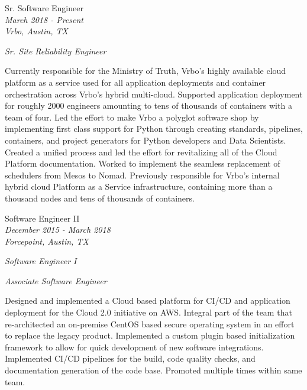 \documentclass[10pt]{article} %
\begin{document}
\begin{minipage}[t]{0.5\textwidth}
{\raggedright\large Sr. Software Engineer\\
\textit{March 2018 - Present}\\
\textit{Vrbo, Austin, TX} \\
\raggedright\small \textit{Sr. Site Reliability Engineer}\\[5pt]}

\normalsize{Currently responsible for the Ministry of Truth, Vrbo's highly available cloud platform as a service used for all application deployments and container orchestration across Vrbo's hybrid multi-cloud. Supported application deployment for roughly 2000 engineers amounting to tens of thousands of containers with a team of four. Led the effort to make Vrbo a polyglot software shop by implementing first class support for Python through creating standards, pipelines, containers, and project generators for Python developers and Data Scientists. Created a unified process and led the effort for revitalizing all of the Cloud Platform documentation. Worked to implement the seamless replacement of schedulers from Mesos to Nomad. Previously responsible for Vrbo's internal hybrid cloud Platform as a Service infrastructure, containing more than a thousand nodes and tens of thousands of containers.  }\\


{
\raggedright\large  Software Engineer II\\
\textit{December 2015 - March 2018}\\
\textit{Forcepoint, Austin, TX}\\
\raggedright\small \textit{Software Engineer I}\\
\raggedright\small \textit{Associate Software Engineer}\\
[5pt]
}

\normalsize{Designed and implemented a Cloud based platform for CI/CD and application deployment for the Cloud 2.0 initiative on AWS. Integral part of the team that re-architected an on-premise CentOS based secure operating system in an effort to replace the legacy product. Implemented a custom plugin based initialization framework to allow for quick development of new software integrations. Implemented CI/CD pipelines for the build, code quality checks, and documentation generation of the code base. Promoted multiple times within same team.}\\


\end{minipage} %
\end{document}
